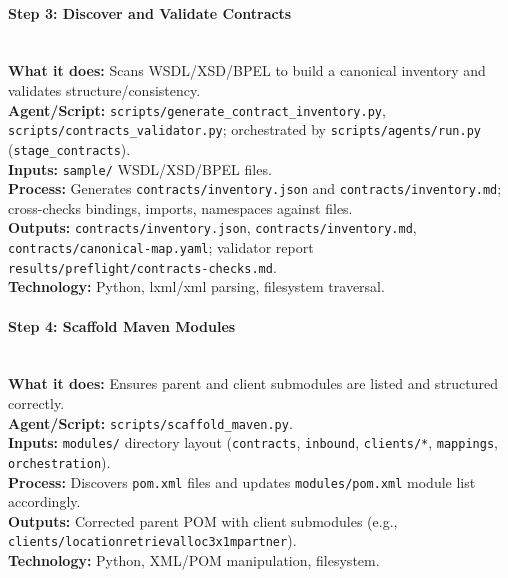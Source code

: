 \documentclass[11pt,a4paper]{article}
\begin{document}
\paragraph{Step 3: Discover and Validate Contracts} \hfill\\
\textbf{What it does:} Scans WSDL/XSD/BPEL to build a canonical inventory and validates structure/consistency.\\
\textbf{Agent/Script:} \texttt{scripts/generate\_contract\_inventory.py}, \texttt{scripts/contracts\_validator.py}; orchestrated by \texttt{scripts/agents/run.py} (\texttt{stage\_contracts}).\\
\textbf{Inputs:} \texttt{sample/} WSDL/XSD/BPEL files.\\
\textbf{Process:} Generates \texttt{contracts/inventory.json} and \texttt{contracts/inventory.md}; cross-checks bindings, imports, namespaces against files.\\
\textbf{Outputs:} \texttt{contracts/inventory.json}, \texttt{contracts/inventory.md}, \texttt{contracts/canonical-map.yaml}; validator report \texttt{results/preflight/contracts-checks.md}.\\
\textbf{Technology:} Python, lxml/xml parsing, filesystem traversal.

\paragraph{Step 4: Scaffold Maven Modules} \hfill\\
\textbf{What it does:} Ensures parent and client submodules are listed and structured correctly.\\
\textbf{Agent/Script:} \texttt{scripts/scaffold\_maven.py}.\\
\textbf{Inputs:} \texttt{modules/} directory layout (\texttt{contracts}, \texttt{inbound}, \texttt{clients/*}, \texttt{mappings}, \texttt{orchestration}).\\
\textbf{Process:} Discovers \texttt{pom.xml} files and updates \texttt{modules/pom.xml} module list accordingly.\\
\textbf{Outputs:} Corrected parent POM with client submodules (e.g., \texttt{clients/locationretrievalloc3x1mpartner}).\\
\textbf{Technology:} Python, XML/POM manipulation, filesystem.
\end{document}
